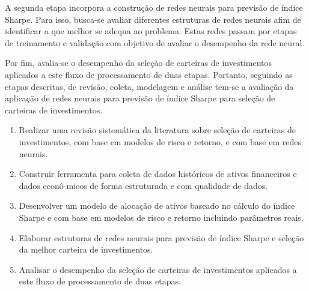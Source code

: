 {        \ipar A segunda etapa incorpora a construção de redes neurais para previsão de índice Sharpe. Para isso, busca-se avaliar diferentes estruturas de redes neurais afim de identificar a que melhor se adequa ao problema. Estas redes passam por etapas de treinamento e validação com objetivo de avaliar o desempenho da rede neural.

        \ipar Por fim, avalia-se o desempenho da seleção de carteiras de investimentos aplicados a este fluxo de processamento de duas etapas. Portanto, seguindo as etapas descritas, de revisão, coleta, modelagem e análise tem-se a avaliação da aplicação de redes neurais para previsão de índice Sharpe para seleção de carteiras de investimentos.



        \begin{enumerate}
            \item Realizar uma revisão sistemática da literatura sobre seleção de carteiras de investimentos, com base em modelos de risco e retorno, e com base em redes neurais.
            \item Construir ferramenta para coleta de dados históricos de ativos financeiros e dados econô-micos de forma estruturada e com qualidade de dados.
            \item Desenvolver um modelo de alocação de ativos baseado no cálculo do índice Sharpe e com base em modelos de risco e retorno incluindo parâmetros reais.
            \item Elaborar estruturas de redes neurais para previsão de índice Sharpe e seleção da melhor carteira de investimentos.
            \item Analisar o desempenho da seleção de carteiras de investimentos aplicados a este fluxo de processamento de duas etapas. 
        \end{enumerate}


    }

